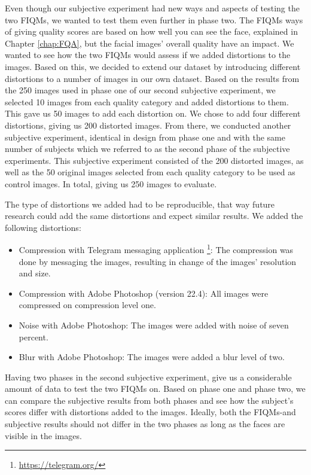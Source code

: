 Even though our subjective experiment had new ways and aspects of testing the two FIQMs, we wanted to test them even further in phase two. The FIQMs ways of giving quality scores are based on how well you can see the face, explained in Chapter \ref{chap:FQA}, but the facial images' overall quality have an impact. We wanted to see how the two FIQMs would assess if we added distortions to the images. Based on this, we decided to extend our dataset by introducing different distortions to a number of images in our own dataset. Based on the results from the 250 images used in phase one of our second subjective experiment, we selected 10 images from each quality category and added distortions to them. This gave us 50 images to add each distortion on. We chose to add four different distortions, giving us 200 distorted images. From there, we conducted another subjective experiment, identical in design from phase one and with the same number of subjects which we referred to as the second phase of the subjective experiments. This subjective experiment consisted of the 200 distorted images, as well as the 50 original images selected from each quality category to be used as control images. In total, giving us 250 images to evaluate.

The type of distortions we added had to be reproducible, that way future research could add the same distortions and expect similar results. We added the following distortions: 
%
\begin{itemize}
    \item Compression with Telegram messaging application \footnote{\url{https://telegram.org/}}: The compression was done by messaging the images, resulting in change of the images' resolution and size.
    \item Compression with Adobe Photoshop (version 22.4): All images were compressed on compression level one.
    \item Noise with Adobe Photoshop: The images were added with noise of seven percent. 
    \item Blur with Adobe Photoshop: The images were added a blur level of two. 
\end{itemize}
%
Having two phases in the second subjective experiment, give us a considerable amount of data to test the two FIQMs on. Based on phase one and phase two, we can compare the subjective results from both phases and see how the subject's scores differ with distortions added to the images. Ideally, both the FIQMs-and subjective results should not differ in the two phases as long as the faces are visible in the images.


